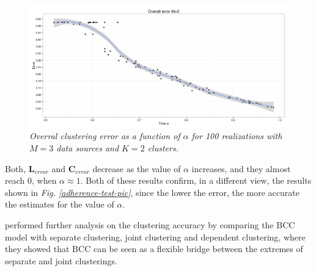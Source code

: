 \begin{figure}[!ht]
\begin{center}
 \includegraphics[scale = 0.39]{images/overallError.png}
\caption{\emph{Overral clustering error as a function of $\alpha$ for 100 realizations with $M=3$ data sources and $K=2$ clusters.}}
\label{overall-error-pic}
\end{center}
\end{figure}

Both, $\mathbf{L}_{error}$ and $\mathbf{C}_{error}$ decrease as the value of $\alpha$ increases, and they almost reach 0, when $\alpha \approx 1$. Both of these results confirm, in a different view, the results shown in \emph{Fig. \ref{adherence-test-pic}}, since the lower the error, the more accurate the estimates for the value of $\alpha$.

\citet{Lock2013} performed further analysis on the clustering accuracy by comparing the BCC model with separate clustering, joint clustering and dependent clustering, where they showed that BCC can be seen as a flexible bridge between the extremes of separate and joint clusterings.